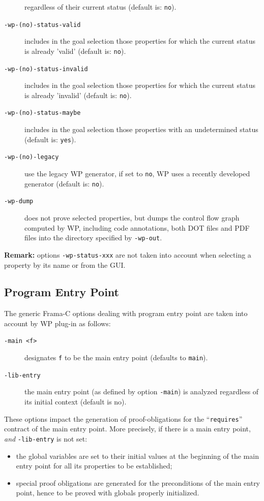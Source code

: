 \begin{description}
  regardless of their current status (default is: \texttt{no}).
\item [\tt -wp-(no)-status-valid] includes in the goal selection those properties
  for which the current status is already 'valid' (default is: \texttt{no}).
\item [\tt -wp-(no)-status-invalid] includes in the goal selection those properties
  for which the current status is already 'invalid' (default is: \texttt{no}).
\item [\tt -wp-(no)-status-maybe] includes in the goal selection those properties with
  an undetermined status (default is: \texttt{yes}).
\item [\tt -wp-(no)-legacy] use the legacy WP generator, if set to \texttt{no},
  WP uses a recently developed generator (default is: \texttt{no}).
\item [\tt -wp-dump] does not prove selected properties, but dumps the control
  flow graph computed by WP, including code annotations, both DOT files and PDF
  files into the directory specified by \texttt{-wp-out}.
\end{description}

\textbf{Remark:} options \texttt{-wp-status-xxx} are not taken into account
when selecting a property by its name or from the GUI.

\subsection{Program Entry Point}

The generic \textsf{Frama-C} options dealing with program entry point
are taken into account by \textsf{WP} plug-in as follows:

\begin{description}
\item [\tt -main <f>] designates \texttt{f} to be the main entry point (defaults to \texttt{main}).
\item [\tt -lib-entry] the main entry point (as defined by option
\texttt{-main}) is analyzed regardless of its initial context (default is no).
\end{description}

These options impact the generation of proof-obligations for the
``\texttt{requires}'' contract of the main entry point. More precisely, if there
is a main entry point, \emph{and} \texttt{-lib-entry} is not set:
\begin{itemize}
\item the global variables are set to their initial values at the
  beginning of the main entry point for all its properties to be established;
\item special proof obligations are generated for the preconditions of the
  main entry point, hence to be proved with globals properly initialized.
\end{itemize}

